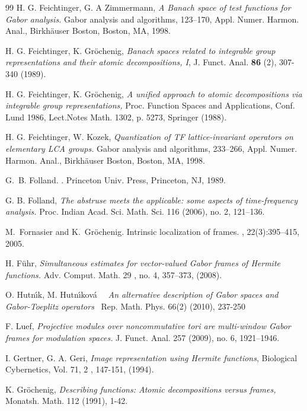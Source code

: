 \documentclass[12pt]{amsart}
\theoremstyle{plain}
\numberwithin{equation}{section}
\begin{document}
\begin{thebibliography}{99}
 H. G. Feichtinger, G. A Zimmermann, \emph{A Banach space of
test functions for Gabor analysis.} Gabor analysis and algorithms, 123--170,
Appl. Numer. Harmon. Anal., Birkh\"{a}user Boston, Boston, MA, 1998.

 H. G. Feichtinger, K. Gr\"{o}chenig, \emph{Banach spaces
related to integrable group representations and their atomic decompositions,
I}, J. Funct. Anal. \textbf{86} (2), 307-340 (1989).

 H. G. Feichtinger, K. Gr\"{o}chenig, \emph{A unified approach
to atomic decompositions via integrable group representations, }Proc.
Function Spaces and Applications, Conf. Lund 1986, Lect.Notes Math. 1302, p.
5273, Springer (1988).

 H. G. Feichtinger, W. Kozek, \emph{Quantization of TF
lattice-invariant operators on elementary LCA groups.} Gabor analysis and
algorithms, 233--266, Appl. Numer. Harmon. Anal., Birkh\"{a}user Boston,
Boston, MA, 1998.

 G.~B. Folland. 
. \newblock Princeton Univ. Press, Princeton, NJ, 1989.

 G. B. Folland, \emph{The abstruse meets the applicable:
some aspects of time-frequency analysis.} Proc. Indian Acad. Sci. Math. Sci.
116 (2006), no. 2, 121--136.

 M.~Fornasier and K.~Gr{\"o}chenig. \newblock Intrinsic
localization of frames. , 22(3):395--415,
2005.

 H. F\"{u}hr, \emph{Simultaneous estimates for vector-valued
Gabor frames of Hermite functions.} Adv. Comput. Math. 29 , no. 4, 357--373,
(2008).

 O. Hutn\'{\i}k, M. Hutn\'{\i}kov\'{a} \ \ \emph{An
alternative description of Gabor spaces and Gabor-Toeplitz operators} \ Rep.
Math. Phys. 66(2) (2010), 237-250

 F. Luef, \emph{Projective modules over noncommutative tori
are multi-window Gabor frames for modulation spaces.} J. Funct. Anal. 257
(2009), no. 6, 1921--1946.

 I. Gertner, G. A. Geri, \emph{Image representation using Hermite
functions}, Biological Cybernetics, Vol. 71, 2 , 147-151, (1994).

 K. Gr\"{o}chenig, \emph{Describing functions: Atomic
decompositions versus frames, }Monatsh. Math. 112 (1991), 1-42.


\end{thebibliography}
\end{document}
